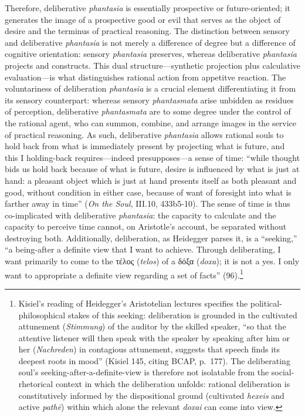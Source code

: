 \documentclass{article}
\newcommand{\gk}[1]{{\greekfont #1}}
\begin{document}
Therefore, deliberative \textit{phantasia} is essentially prospective or future-oriented; it generates the image of a prospective good or evil that serves as the object of desire and the terminus of practical reasoning. The distinction between sensory and deliberative \textit{phantasia} is not merely a difference of degree but a difference of cognitive orientation: sensory \textit{phantasia} preserves, whereas deliberative \textit{phantasia} projects and constructs. This dual structure---synthetic projection plus calculative evaluation---is what distinguishes rational action from appetitve reaction. The voluntariness of deliberation \textit{phantasia} is a crucial element differentiating it from its sensory counterpart: whereas sensory \textit{phantasmata} arise unbidden as residues of perception, deliberative \textit{phantasmata} are to some degree under the control of the rational agent, who can summon, combine, and arrange images in the service of practical reasoning. As such, deliberative \textit{phantasia} allows rational souls to hold back from what is immediately present by projecting what is future, and this I holding-back requires---indeed presupposes---a sense of time: ``while thought bids us hold back because of what is future, desire is influenced by what is just at hand: a pleasant object which is just at hand presents itself as both pleasant and good, without condition in either case, because of want of foresight into what is farther away in time'' (\textit{On the Soul}, III.10, 433b5-10). The sense of time is thus co-implicated with deliberative \textit{phantasia}: the capacity to calculate and the capacity to perceive time cannot, on Aristotle's account, be separated without destroying both. Additionally, deliberation, as Heidegger parses it, is a ``seeking,'' ``a being-after a definite view that I want to achieve. Through deliberating, I want primarily to come to the \gk{τέλος} (\textit{telos}) of a \gk{δόξα} (\textit{doxa}); it is not a yes. I only want to appropriate a definite view regarding a set of facts'' (96).\footnote{Kisiel's reading of Heidegger's Aristotelian lectures specifies the political-philosophical stakes of this seeking: deliberation is grounded in the cultivated attunement (\textit{Stimmung}) of the auditor by the skilled speaker, ``so that the attentive listener will then speak with the speaker by speaking after him or her (\textit{Nachreden}) in contagious attunement, suggests that speech finds its deepest roots in mood'' (Kisiel 145, citing BCAP, p.~177). The deliberating soul's seeking-after-a-definite-view is therefore not isolatable from the social-rhetorical context in which the deliberation unfolds: rational deliberation is constitutively informed by the dispositional ground (cultivated \textit{hexeis} and active \textit{pathē}) within which alone the relevant \textit{doxai} can come into view.}
\end{document}
